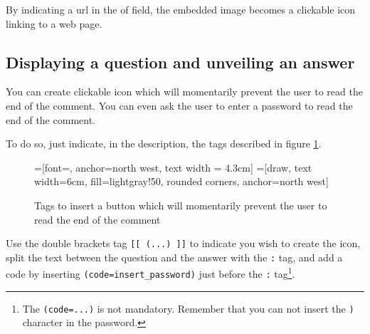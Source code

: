 By indicating a url in the  of  field, 
the embedded image becomes a clickable icon linking to a web page.

\subsection{Displaying a question and unveiling an answer}

You can create clickable icon which will momentarily 
prevent the user to read the end of the comment.
You can even ask the user to enter a password to read the 
end of the comment.

To do so, just indicate, in the description, the tags described in figure \ref{xia_answer_tags}.

\begin{figure}[htp!]
=[font=\sffamily, anchor=north west, text width = 4.3cm]
=[draw, text width=6cm, fill=lightgray!50, rounded corners, anchor=north west]
\caption{Tags to insert a button which will momentarily prevent the user to read the end of the comment}
\label{xia_answer_tags}
\end{figure}

Use the double brackets tag \texttt{[[ (...) ]]} to indicate you wish to create the icon, 
split the text between the question and the answer with the \texttt{:}
tag, and add a code by inserting \texttt{(code=insert\_password)} just before 
the \texttt{:} tag\footnote{The \texttt{(code={...})} is not mandatory. Remember 
that you can not insert the \texttt{)} character in the password.}.
  
